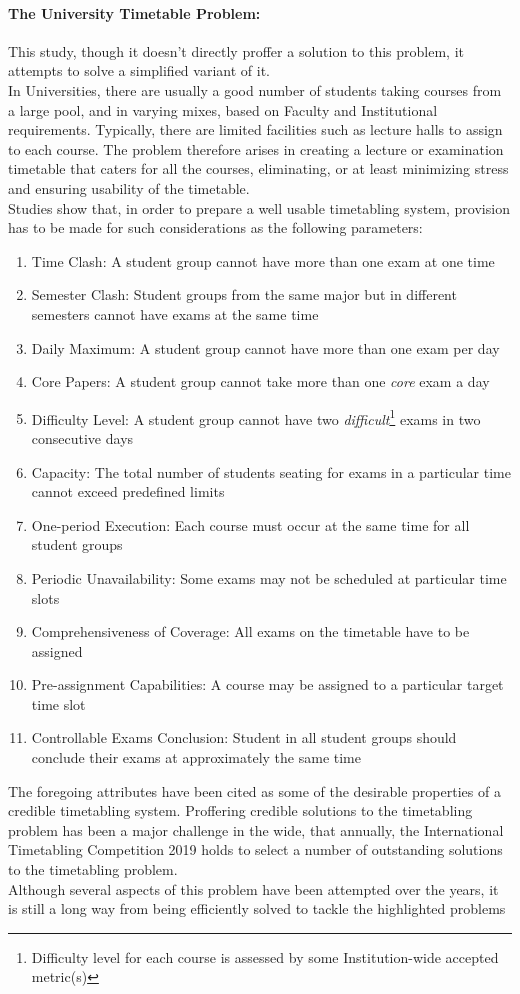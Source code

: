\documentclass[a4paper,openany]{book}
\begin{document}
			\paragraph{The University Timetable Problem:}
			This study, though it doesn't directly proffer a solution to this problem, it attempts to solve a simplified variant of it.
			\\In Universities, there are usually a good number of students taking courses from a large pool, and in varying mixes, based on Faculty and Institutional requirements. Typically, there are limited facilities such as lecture halls to assign to each course. The problem therefore arises in creating a lecture or examination timetable that caters for all the courses, eliminating, or at least minimizing stress and ensuring usability of the timetable.
			\\Studies show that, in order to prepare a well usable timetabling system, provision has to be made for such considerations as the following parameters:
			\begin{enumerate}
				\item Time Clash: A student group cannot have more than one exam at one time
				\item Semester Clash: Student groups from the same major but in different semesters cannot have exams at the same time
				\item Daily Maximum: A student group cannot have more than one exam per day
				\item Core Papers: A student group cannot take more than one \textit{core} exam a day
				\item Difficulty Level: A student group cannot have two \textit{difficult}\footnote{Difficulty level for each course is assessed by some Institution-wide accepted metric(s)} exams in two consecutive days
				\item Capacity: The total number of students seating for exams in a particular time cannot exceed predefined limits
				\item One-period Execution: Each course must occur at the same time for all student groups
				\item Periodic Unavailability: Some exams may not be scheduled at particular time slots
				\item Comprehensiveness of Coverage: All exams on the timetable have to be assigned
				\item Pre-assignment Capabilities: A course may be assigned to a particular target time slot
				\item Controllable Exams Conclusion: Student in all student groups should conclude their exams at approximately the same time
			\end{enumerate}
			The foregoing attributes have been cited as some of the desirable properties of a credible timetabling system. Proffering credible solutions to the timetabling problem has been a major challenge in the wide, that annually, the International Timetabling Competition 2019 \cite{itc2019} holds to select a number of outstanding solutions to the timetabling problem.\\
			Although several aspects of this problem have been attempted over the years, it is still a long way from being efficiently solved to tackle the highlighted problems
\end{document}
